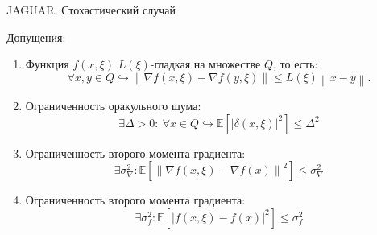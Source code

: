 \documentclass{beamer}
\newcommand{\expect}[1]{\mathbb{E}\left[ #1 \right]}
\newcommand{\norms}[1]{\left\| #1 \right\|}
\begin{document}

\begin{frame}{JAGUAR. Стохастический случай}

    Допущения:
        \begin{enumerate}
            \item Функция $f(x, \xi)$ $L(\xi)$-гладкая на множестве $Q$, то есть: 
                \begin{equation*}
                    \forall x, y \in Q \hookrightarrow \left\|\nabla f(x, \xi) - \nabla f(y, \xi)\right\| \leq L(\xi) \left\|x-y\right\|.
                \end{equation*}

            \item Ограниченность оракульного шума:
                \begin{equation*}
                    \exists \Delta > 0 : ~\forall x \in Q \hookrightarrow \expect{|\delta(x, \xi)|^2} \leq \Delta^2
                \end{equation*}

            \item Ограниченность второго момента градиента:
                \begin{equation*}
                    \exists \sigma^2_{\nabla} : \expect{\norms{\nabla f(x, \xi) - \nabla f(x)}^2} \leq \sigma^2_{\nabla}
                \end{equation*}

            \item Ограниченность второго момента градиента:
                \begin{equation*}
                    \exists \sigma^2_{f} : \expect{\left|f(x, \xi) - f(x) \right|^2} \leq \sigma^2_{f}
                \end{equation*}
        \end{enumerate}    

\end{frame}

\end{document}
